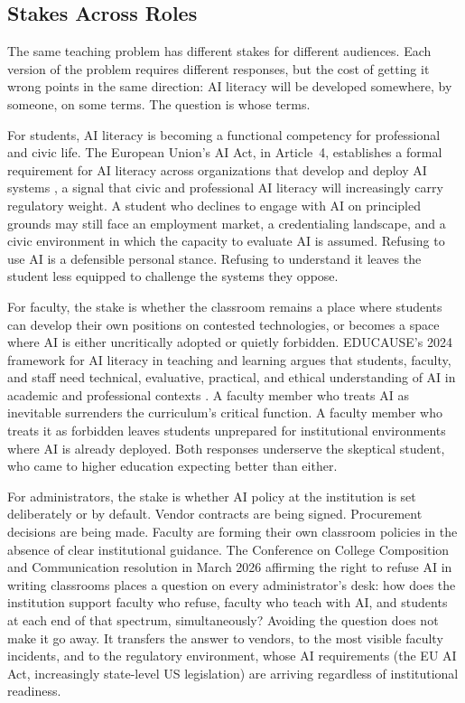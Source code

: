 \documentclass[12pt]{article}
\begin{document}
\subsection{Stakes Across Roles}
\label{sec:I.3}

The same teaching problem has different stakes for different audiences. Each version of the problem requires different responses, but the cost of getting it wrong points in the same direction: AI literacy will be developed somewhere, by someone, on some terms. The question is whose terms.

For students, AI literacy is becoming a functional competency for professional and civic life. The European Union's AI Act, in Article~4, establishes a formal requirement for AI literacy across organizations that develop and deploy AI systems \autocite{eu2024aiact}, a signal that civic and professional AI literacy will increasingly carry regulatory weight. A student who declines to engage with AI on principled grounds may still face an employment market, a credentialing landscape, and a civic environment in which the capacity to evaluate AI is assumed. Refusing to use AI is a defensible personal stance. Refusing to understand it leaves the student less equipped to challenge the systems they oppose.

For faculty, the stake is whether the classroom remains a place where students can develop their own positions on contested technologies, or becomes a space where AI is either uncritically adopted or quietly forbidden. EDUCAUSE's 2024 framework for AI literacy in teaching and learning argues that students, faculty, and staff need technical, evaluative, practical, and ethical understanding of AI in academic and professional contexts \autocite{educause2024literacy}. A faculty member who treats AI as inevitable surrenders the curriculum's critical function. A faculty member who treats it as forbidden leaves students unprepared for institutional environments where AI is already deployed. Both responses underserve the skeptical student, who came to higher education expecting better than either.

For administrators, the stake is whether AI policy at the institution is set deliberately or by default. Vendor contracts are being signed. Procurement decisions are being made. Faculty are forming their own classroom policies in the absence of clear institutional guidance. The Conference on College Composition and Communication resolution in March 2026 affirming the right to refuse AI in writing classrooms places a question on every administrator's desk: how does the institution support faculty who refuse, faculty who teach with AI, and students at each end of that spectrum, simultaneously? Avoiding the question does not make it go away. It transfers the answer to vendors, to the most visible faculty incidents, and to the regulatory environment, whose AI requirements (the EU AI Act, increasingly state-level US legislation) are arriving regardless of institutional readiness.
\end{document}
